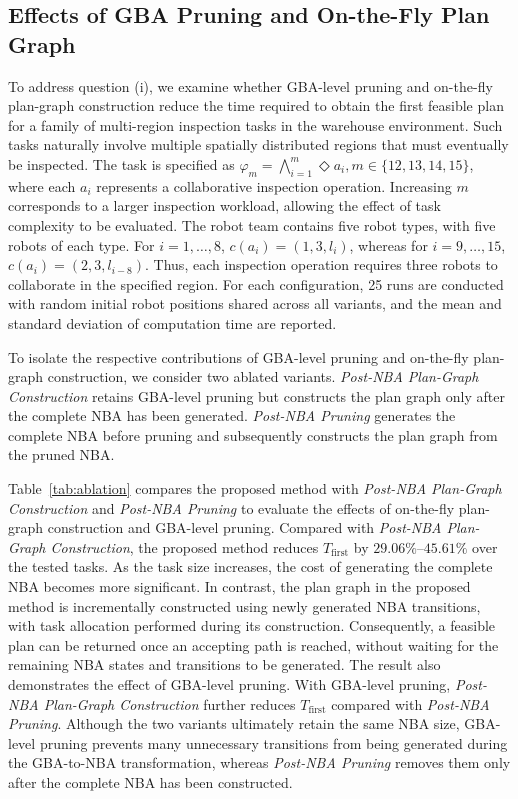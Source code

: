 \documentclass[lettersize,journal]{IEEEtran}
\theoremstyle{italiclemma}
\theoremstyle{italiclemma}
\theoremstyle{definition}
\begin{document}
\subsection{Effects of GBA Pruning and On-the-Fly Plan Graph} \label{sec:ablation}
To address question (i), we examine whether GBA-level pruning and on-the-fly plan-graph construction reduce the time required to obtain the first feasible plan for a family of multi-region inspection tasks in the warehouse
environment. Such tasks naturally involve multiple spatially distributed regions that must eventually be inspected\cite{inbook}.  The task is specified as $\varphi_m=\bigwedge_{i=1}^{m}\Diamond a_i, m\in\{12,13,14,15\}$, where each $a_i$ represents a collaborative inspection operation. Increasing $m$ corresponds to a larger inspection workload, allowing the effect of task
complexity to be evaluated. The robot team contains five robot types, with five robots of each type. For $i=1,\ldots,8$, $c(a_i)=(1,3,l_i)$, whereas for $i=9,\ldots,15$, $c(a_i)=(2,3,l_{i-8})$. Thus, each inspection operation requires three robots to collaborate in the specified region. For each configuration, 25 runs are conducted with random initial robot positions shared across all variants, and the mean and standard deviation of computation time are reported.


To isolate the respective contributions of GBA-level pruning and on-the-fly plan-graph construction, we consider two ablated variants. \emph{Post-NBA Plan-Graph Construction} retains GBA-level pruning but constructs the plan graph only after the complete NBA has been generated.  \emph{Post-NBA Pruning} generates the complete NBA before pruning and subsequently constructs the plan graph from the pruned NBA.

Table~\ref{tab:ablation} compares the proposed method with
\emph{Post-NBA Plan-Graph Construction} and \emph{Post-NBA Pruning} to evaluate the effects of on-the-fly plan-graph construction and GBA-level pruning. Compared with \emph{Post-NBA Plan-Graph Construction}, the proposed method reduces $T_{\mathrm{first}}$ by $29.06\%$--$45.61\%$ over the tested tasks.  As the task size increases, the cost of generating the complete NBA becomes more significant. In contrast, the plan graph in the proposed method is incrementally constructed using newly generated NBA transitions, with task allocation performed during its construction. Consequently, a feasible plan can be returned once an accepting path is reached, without waiting for the remaining NBA states and transitions to be generated. The result also demonstrates the effect of GBA-level pruning.  With GBA-level pruning, \emph{Post-NBA Plan-Graph Construction} further reduces $T_{\mathrm{first}}$ compared with \emph{Post-NBA Pruning}. Although the two variants ultimately retain the same NBA size, GBA-level pruning prevents many unnecessary transitions from being generated during the GBA-to-NBA transformation, whereas \emph{Post-NBA Pruning} removes them only after the complete NBA has been constructed.
\end{document}
